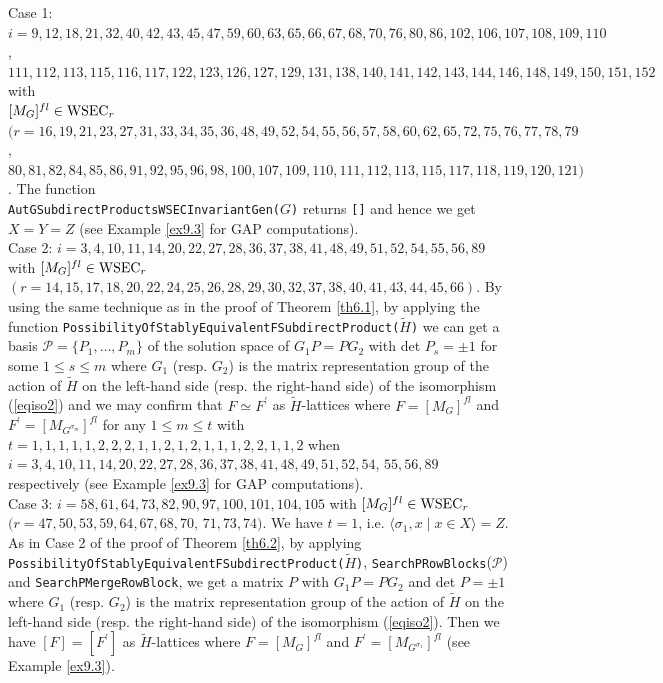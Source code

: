 \documentclass{amsart}
\theoremstyle{plain}
\theoremstyle{definition}
\theoremstyle{remark}
\begin{document}
Case 1: $i=9,12,18,21,32,40,42,43,45,47,59,60,63,65,66,67,68,70,76,80,86,102,106,107,108,109,110$, $111,112,113,115,116,117,122,123,126,127,129,131,138,140,141,142,143,144,146,148,149,150,151,152$ 
with\\ 
$[M_G]^{fl}\in {\rm WSEC}_r$ 
$(r=16,19,21,23,27,31,33,34,35,36,48,49,52,54,55,56,57,58,60,62,65,72,75,76,77,78,79$,\\
$80,81,82,84,85,86,91,92,95,96,98,100,107,109,110,111,112,113,115,117,118,119,120,121)$. 
The function\\ {\tt AutGSubdirectProductsWSECInvariantGen(}$G${\tt)} 
returns {\tt []} and hence we get $X=Y=Z$ (see Example \ref{ex9.3} for GAP computations).\\

Case 2: $i=3,4,10,11,14,20,22,27,28,36,37,38,41,48,49,51,52,54,55,56,89$ 
with 
$[M_G]^{fl}\in {\rm WSEC}_r$ 
$(r=14,15,17,18,20,22,24,25,26,28,29,30,32,37,38,40,41,43,44,45,66)$. 
%
By using the same technique as in the proof of Theorem \ref{th6.1}, 
by applying the function 
{\tt PossibilityOfStablyEquivalentFSubdirectProduct($\widetilde{H}$)} 
we can get a basis $\mathcal{P}=\{P_1,\dots,P_m\}$ 
of the solution space of $G_1P=PG_2$ 
with det $P_s=\pm 1$ for some $1\leq s\leq m$ 
where $G_1$ (resp. $G_2$) 
is the matrix representation group of the action of 
$\widetilde{H}$ on the left-hand side 
(resp. the right-hand side) of the isomorphism (\ref{eqiso2}) 
and 
we may confirm that $F\simeq F^\prime$ as $\widetilde{H}$-lattices 
where $F=[M_G]^{fl}$ and $F^\prime=[M_{G^{\sigma_m}}]^{fl}$ 
for any $1\leq m\leq t$ with $t=1,1,1,1,1,2,2,2,1,1,2,1,2,1,1,1,2,2,1,1,2$ when $i=3,4,10,11,14,20,22,27,28,36,37,38,41,48,49,51,52,54$, 
$55,56,89$ respectively (see Example \ref{ex9.3} for GAP computations).\\

Case 3: $i=58,61,64,73,82,90,97,100,101,104,105$ 
with 
$[M_G]^{fl}\in {\rm WSEC}_r$ 
$(r=47,50,53,59,64,67,68,70$, $71,73,74)$. 
We have $t=1$, i.e. $\langle \sigma_1,x\mid x\in X\rangle=Z$. 
As in Case 2 of the proof of Theorem \ref{th6.2}, 
by applying %
{\tt PossibilityOfStablyEquivalentFSubdirectProduct($\widetilde{H}$)}, 
{\tt SearchPRowBlocks}($\mathcal{P}$) 
and {\tt SearchPMergeRowBlock}, 
we get a matrix $P$ with $G_1P=PG_2$ and det $P=\pm 1$ 
where $G_1$ (resp. $G_2$) 
is the matrix representation group of the action of 
$\widetilde{H}$ on the left-hand side 
(resp. the right-hand side) of the isomorphism (\ref{eqiso2}).  
Then we have $[F]=[F^\prime]$ as $\widetilde{H}$-lattices 
where $F=[M_G]^{fl}$ and $F^\prime=[M_{G^{\sigma_1}}]^{fl}$ 
(see Example \ref{ex9.3}). 
\end{document}
